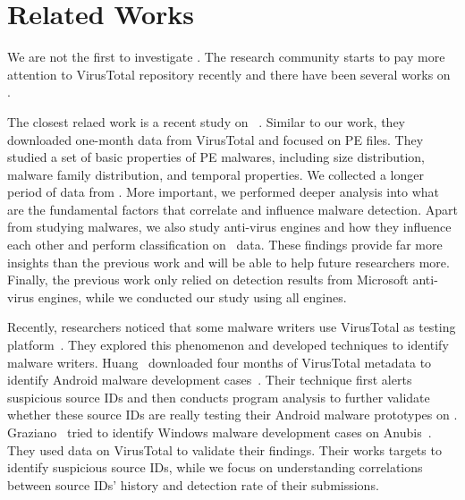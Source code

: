 \section{Related Works}
\label{sec:related}


We are not the first to investigate \vt.
The research community starts to pay more attention to VirusTotal repository recently
and there have been several works on \vt.

The closest relaed work is a recent study on \vt{}~\cite{SongAPsys2016}. 
Similar to our work, they downloaded one-month data from VirusTotal
and focused on PE files.
They studied a set of basic properties of PE malwares,
including size distribution, malware family distribution, and temporal properties.   
We collected a longer period of data from \vt.
More important, we performed deeper analysis into what are the fundamental factors 
that correlate and influence malware detection.
Apart from studying malwares, we also study anti-virus engines and how they influence each other
and perform classification on \vt\ data.
These findings provide far more insights than the previous work and will be able to help future researchers more.
Finally, the previous work only relied on detection results from Microsoft anti-virus engines,
while we conducted our study using all engines.

Recently, researchers noticed that some malware writers use VirusTotal as testing platform~\cite{huangvt2016bigdata, neeles}.
They explored this phenomenon and developed techniques to identify malware writers. 
Huang \etal\ downloaded four months of VirusTotal metadata to identify Android malware development cases~\cite{huangvt2016bigdata}. 
Their technique first alerts suspicious source IDs 
and then conducts program analysis to further validate whether 
these source IDs are really testing their Android malware prototypes on \vt{}. 
Graziano \etal\ tried to identify Windows malware development cases on Anubis~\cite{neeles}. 
They used data on VirusTotal to validate their findings. 
Their works targets to identify suspicious source IDs, 
while we focus on understanding correlations between source IDs' history and detection rate of their submissions.

